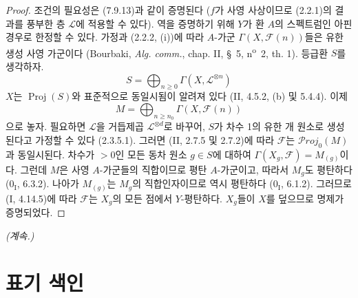 \begin{proof}
조건의 필요성은 (7.9.13)과 같이 증명된다 ($f$가 사영 사상이므로
(2.2.1)의 결과를 풍부한 층 $\mathscr L$에 적용할 수 있다). 역을
증명하기 위해 $Y$가 환 $A$의 스펙트럼인 아핀 경우로 한정할 수 있다.
가정과 (2.2.2, (i))에 따라 $A$-가군
$\Gamma(X,\mathscr F(n))$들은 유한 생성 사영 가군이다 (Bourbaki,
\emph{Alg. comm.}, chap. II, \S~5, n\textsuperscript{o}~2, th. 1).
등급환 $S$를 생각하자.
\[
  S=\bigoplus_{n\geq0}\Gamma(X,\mathscr L^{\otimes n})
\]
$X$는 $\operatorname{Proj}(S)$와 표준적으로 동일시됨이
알려져 있다 (II, 4.5.2, (b) 및 5.4.4). 이제
\[
  M=\bigoplus_{n\geq n_0}\Gamma(X,\mathscr F(n))
\]
으로 놓자. 필요하면 $\mathscr L$을 거듭제곱
$\mathscr L^{\otimes d}$로 바꾸어, $S$가 차수 1의 유한 개 원소로
생성된다고 가정할 수 있다 (2.3.5.1). 그러면 (II, 2.7.5 및 2.7.2)에
따라 $\mathscr F$는 $\mathscr P\!roj_0(M)$과 동일시된다. 차수가
$>0$인 모든 동차 원소 $g\in S$에 대하여
$\Gamma(X_g,\mathscr F)=M_{(g)}$이다. 그런데 $M$은 사영
$A$-가군들의 직합이므로 평탄 $A$-가군이고, 따라서 $M_g$도 평탄하다
($0_{\mathrm I}$, 6.3.2). 나아가 $M_{(g)}$는 $M_g$의 직합인자이므로
역시 평탄하다 ($0_{\mathrm I}$, 6.1.2). 그러므로 (I, 4.14.5)에 따라
$\mathscr F$는 $X_g$의 모든 점에서 $Y$-평탄하다. $X_g$들이 $X$를
덮으므로 명제가 증명되었다.
\end{proof}

\bigskip
\noindent\emph{(계속.)}


\clearpage
{}
\section*{표기 색인}

